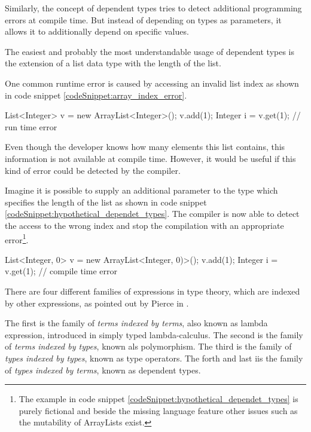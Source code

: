 Similarly, the concept of dependent types tries to detect additional programming errors at compile time.
But instead of depending on types as parameters, it allows it to additionally depend on specific values. 

The easiest and probably the most understandable usage of dependent types is the extension of a list data type with the length of the list. 

One common runtime error is caused by accessing an invalid list index as shown in code snippet \ref{codeSnippet:array_index_error}.

\begin{codesnippet}[caption={ArrayList index error}, label={codeSnippet:array_index_error}]
List<Integer> v = new ArrayList<Integer>();
v.add(1);
Integer i = v.get(1); // run time error
\end{codesnippet}

Even though the developer knows how many elements this list contains, this information is not available at compile time. 
However, it would be useful if this kind of error could be detected by the compiler.

Imagine it is possible to supply an additional parameter to the type which specifies the length of the list as shown in code snippet \ref{codeSnippet:hypothetical_dependet_types}. 
The compiler is now able to detect the access to the wrong index and stop the compilation with an appropriate error\footnote{The example in code snippet \ref{codeSnippet:hypothetical_dependet_types} is purely fictional and beside the missing language feature other issues such as the mutability of ArrayLists exist.}.
\begin{adjustbox}{width=\columnwidth}
\begin{codesnippet}[escapeinside={(*}{*)}, caption={ArrayList with size parameter}, label={codeSnippet:hypothetical_dependet_types}]
List<Integer, 0> v = new ArrayList<Integer, 0)>();
v.add(1);
Integer i = v.get(1); // compile time error
\end{codesnippet}
\end{adjustbox}
\linebreak

There are four different families of expressions in type theory, which are indexed by other expressions, as pointed out by Pierce in \cite{10.5555/1076265}. 

The first is the family of \emph{terms indexed by terms}, also known as lambda expression, introduced in simply typed lambda-calculus. 
The second is the family of \emph{terms indexed by types}, known als polymorphism. 
The third is the family of \emph{types indexed by types}, known as type operators.
The forth and last iis the family of \emph{types indexed by terms}, known as dependent types.

